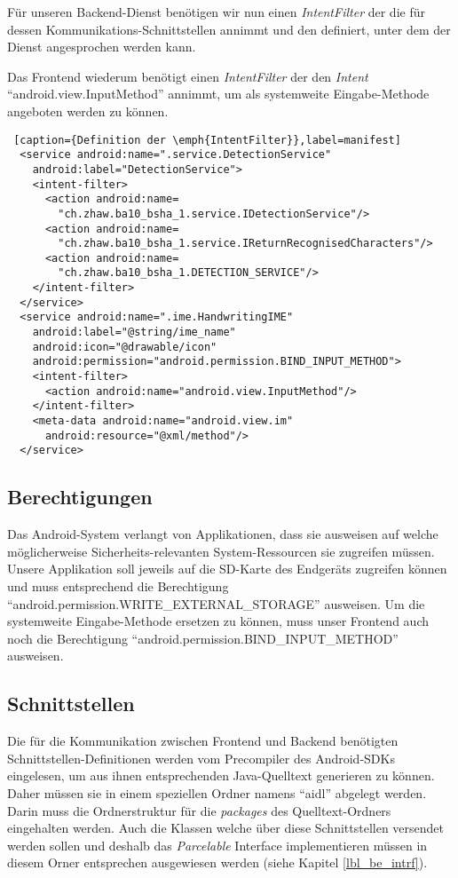 Für unseren Backend-Dienst benötigen wir nun einen \emph{IntentFilter} der die  für dessen Kommunikations-Schnittstellen annimmt und den  definiert, unter dem der Dienst angesprochen werden kann.

Das Frontend wiederum benötigt einen \emph{IntentFilter} der den \emph{Intent} ``android.view.InputMethod'' annimmt, um als systemweite Eingabe-Methode angeboten werden zu können.

\begin{lstlisting} [caption={Definition der \emph{IntentFilter}},label=manifest]
  <service android:name=".service.DetectionService" 
    android:label="DetectionService">
    <intent-filter>
      <action android:name=
        "ch.zhaw.ba10_bsha_1.service.IDetectionService"/>
      <action android:name=
        "ch.zhaw.ba10_bsha_1.service.IReturnRecognisedCharacters"/>
      <action android:name=
        "ch.zhaw.ba10_bsha_1.DETECTION_SERVICE"/>
    </intent-filter>
  </service>
  <service android:name=".ime.HandwritingIME"
    android:label="@string/ime_name" 
    android:icon="@drawable/icon" 
    android:permission="android.permission.BIND_INPUT_METHOD">
    <intent-filter>
      <action android:name="android.view.InputMethod"/>
    </intent-filter>
    <meta-data android:name="android.view.im" 
      android:resource="@xml/method"/>
  </service>
\end{lstlisting}

\subsection{Berechtigungen}

Das Android-System verlangt von Applikationen, dass sie ausweisen auf welche möglicherweise Sicherheits-relevanten System-Ressourcen sie zugreifen müssen. Unsere Applikation soll jeweils auf die SD-Karte des Endgeräts zugreifen können und muss entsprechend die Berechtigung ``android.permission.WRITE_EXTERNAL_STORAGE'' ausweisen. Um die systemweite Eingabe-Methode ersetzen zu können, muss unser Frontend auch noch die Berechtigung ``android.permission.BIND_INPUT_METHOD'' ausweisen.

\subsection{Schnittstellen}

Die für die Kommunikation zwischen Frontend und Backend benötigten Schnittstellen-Definitionen werden vom Precompiler des Android-SDKs eingelesen, um aus ihnen entsprechenden Java-Quelltext generieren zu können. Daher müssen sie in einem speziellen Ordner namens ``aidl'' abgelegt werden. Darin muss die Ordnerstruktur für die \emph{packages} des Quelltext-Ordners eingehalten werden. Auch die Klassen welche über diese Schnittstellen versendet werden sollen und deshalb das \emph{Parcelable} Interface implementieren müssen in diesem Orner entsprechen ausgewiesen werden (siehe Kapitel \ref{lbl_be_intrf}).
